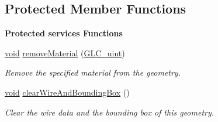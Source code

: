 \subsection*{Protected Member Functions}
\begin{Indent}{\bf Protected services Functions}\par
\begin{DoxyCompactItemize}
\item 
\hyperlink{group___u_a_v_objects_plugin_ga444cf2ff3f0ecbe028adce838d373f5c}{void} \hyperlink{class_g_l_c___geometry_aadb9a2cbb3b91aa75eb874ace96ac55e}{remove\-Material} (\hyperlink{glc__global_8h_abf950976fabed69026558df8e2da6c6b}{G\-L\-C\-\_\-uint})
\begin{DoxyCompactList}\small\item\em Remove the specified material from the geometry. \end{DoxyCompactList}\item 
\hyperlink{group___u_a_v_objects_plugin_ga444cf2ff3f0ecbe028adce838d373f5c}{void} \hyperlink{class_g_l_c___geometry_a7f4edc3c5ad356cd788a5c4fdf96a2ce}{clear\-Wire\-And\-Bounding\-Box} ()
\begin{DoxyCompactList}\small\item\em Clear the wire data and the bounding box of this geometry. \end{DoxyCompactList}\end{DoxyCompactItemize}
\end{Indent}
